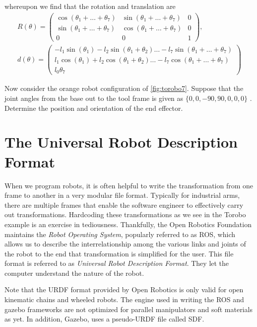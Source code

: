 %
whereupon we find that the rotation and translation are 
%
\begin{align}
	R(\theta) = \left(\begin{array}{ccc}
	\cos(\theta_1+\ldots + \theta_7) & \sin(\theta_1+\ldots + \theta_7) &0 \\
	\sin(\theta_1+\ldots + \theta_7) & \cos(\theta_1+\ldots + \theta_7) &0 \\
	0 & 0 & 1
	\end{array}\right), 
	\nonumber \\
	d(\theta) = \left(\begin{array}{c}
	-l_1 \sin(\theta_1) - l_2 \sin(\theta_1+ \theta_2) \ldots - l_7\sin(\theta_1+  \ldots + \theta_7) \\
	l_1 \cos(\theta_1) + l_2 \cos(\theta_1+ \theta_2) \ldots - l_7\cos(\theta_1 + \ldots + \theta_7) \\
	l_0  \theta_7
	\end{array}\right) 
\end{align}

\begin{homework}
	Now consider the orange robot configuration of \autoref{fig:torobo7}. Suppose that the joint angles from the base out to the tool frame is given as $\{0, 0, -90, 90, 0, 0, 0\}$ . Determine the position and orientation of the end effector. 
\end{homework}

\section{The Universal Robot Description Format}
%
When we program robots, it is often helpful to write the transformation from one frame to another in a very modular file format. Typically for industrial arms, there are multiple frames that enable the software engineer to effectively carry out transformations. Hardcoding these transformations as we see in the Torobo example is an exercise in tediousness. Thankfully, the Open Robotics Foundation maintains the \textit{Robot Operating System}, popularly referred to as ROS, which allows us to describe the interrelationship among the various links and joints of the robot to the end that transformation is simplified for the user. This file format is referred to as \textit{Universal Robot Description Format}. They let the computer understand the nature of the robot. 

Note that the URDF format provided by Open Robotics is only valid for open kinematic chains and wheeled robots. The engine used in writing the ROS and gazebo frameworks are not optimized for parallel manipulators and soft materials as yet. In addition, Gazebo, uses a pseudo-URDF file called \textsc{SDF}. 

